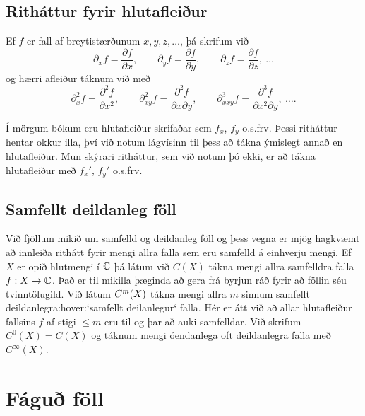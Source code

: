 \subsection*{Ritháttur fyrir hlutafleiður}



Ef $f$ er fall af breytistærðunum $x,y,z,\dots$, þá skrifum við
$$
{\partial}_xf=\dfrac{\partial f}{\partial x}, \qquad
{\partial}_yf=\dfrac{\partial f}{\partial y}, \qquad
{\partial}_zf=\dfrac{\partial f}{\partial z}, \ \dots
$$
og hærri afleiður táknum við með
$$
{\partial}_x^2f=\dfrac{\partial^2f}{\partial x^2}, \qquad
{\partial}_{xy}^2f=\dfrac{\partial^2f}{\partial x\partial y}, \qquad
{\partial}_{xxy}^3f=\dfrac{\partial^3f}{\partial x^2\partial y}, \ \dots.
$$

Í mörgum bókum eru hlutafleiður skrifaðar sem $f_{x}$, $f_y$ o.s.frv.
 Þessi
ritháttur hentar okkur illa, því við notum lágvísinn til þess að tákna
ýmislegt annað en hlutafleiður.  Mun skýrari ritháttur, sem við notum
þó ekki,  er að tákna
hlutafleiður með $f_x'$, $f_y'$ o.s.frv.  

\subsection*{Samfellt deildanleg föll}

\medskip\noindent
Við fjöllum mikið  um
samfelld og deildanleg föll  og 
þess vegna er mjög hagkvæmt að innleiða rithátt fyrir mengi allra falla
sem eru samfelld á einhverju mengi.
Ef $X$ er opið hlutmengi í ${\mathbb C}$ þá látum við $C(X)$ tákna mengi
allra samfelldra falla $f:X\to {\mathbb C}$.  Það er til mikilla þæginda að
gera frá byrjun ráð fyrir að föllin séu tvinntölugild.  Við látum
$C\sp m(X)$ tákna mengi allra $m$ sinnum samfellt
deildanlegra:hover:`samfellt deilanlegur` falla.
Hér er átt við að allar hlutafleiður fallsins $f$ af stigi $\leq m$
eru til og þar að auki samfelldar.  Við skrifum $C^0(X)=C(X)$ og
táknum mengi óendanlega oft deildanlegra falla með $C^{\infty}(X)$.


\section{Fáguð föll}


